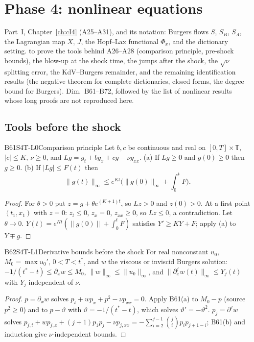 \chapter{Phase 4: nonlinear equations}\label{ch:cII4}
\chapterbrief
{Part~I, Chapter~\ref{ch:cI4} (A25--A31), and its notation: Burgers flows $S$, $S_B$, $S_A$, the Lagrangian map $X$, $J$, the Hopf--Lax functional $\Phi_x$, and the dictionary setting.}
{to prove the tools behind A26--A28 (comparison principle, pre-shock bounds), the blow-up at the shock time, the jumps after the shock, the $\sqrt\nu$ splitting error, the KdV--Burgers remainder, and the remaining identification results (the negative theorem for complete dictionaries, closed forms, the degree bound for Burgers).}
{Dim.~B61--B72, followed by the list of nonlinear results whose long proofs are not reproduced here.}

\section{Tools before the shock}

\begin{dimcard}{B61}{S4T-L0}{Comparison principle}{\proved}{}
Let $b,c$ be continuous and real on $[0,T]\times\mathbb T$, $|c|\le K$, $\nu\ge0$, and $Lg=g_t+bg_x+cg-\nu g_{xx}$. (a) If $Lg\ge0$ and $g(0)\ge0$ then $g\ge0$. (b) If $|Lg|\le F(t)$ then
\[
\|g(t)\|_\infty\le e^{Kt}\Big(\|g(0)\|_\infty+\int_0^tF\Big).
\]
\end{dimcard}
\begin{proof}
For $\theta>0$ put $z=g+\theta e^{(K+1)t}$, so $Lz>0$ and $z(0)>0$. At a first point $(t_1,x_1)$ with $z=0$: $z_t\le0$, $z_x=0$, $z_{xx}\ge0$, so $Lz\le0$, a contradiction. Let $\theta\to0$.
$Y(t)=e^{Kt}(\|g(0)\|+\int_0^tF)$ satisfies $Y'\ge KY+F$; apply (a) to $Y\mp g$.
\end{proof}

\begin{dimcard}{B62}{S4T-L1}{Derivative bounds before the shock}{\proved}{}
For real nonconstant $u_0$, $M_0=\max u_0'$, $0<T<t^*$, and $w$ the viscous or inviscid Burgers solution: $-1/(t^*-t)\le\partial_xw\le M_0$, $\|w\|_\infty\le\|u_0\|_\infty$, and $\|\partial_x^jw(t)\|_\infty\le Y_j(t)$ with $Y_j$ independent of $\nu$.
\end{dimcard}
\begin{proof}
$p=\partial_xw$ solves $p_t+wp_x+p^2-\nu p_{xx}=0$. Apply B61(a) to $M_0-p$ (source $p^2\ge0$) and to $p-\vartheta$ with $\vartheta=-1/(t^*-t)$, which solves $\vartheta'=-\vartheta^2$.
$p_j=\partial^jw$ solves $p_{j,t}+wp_{j,x}+(j+1)p_1p_j-\nu p_{j,xx}=-\sum_{i=2}^{j-1}\binom jip_ip_{j+1-i}$; B61(b) and induction give $\nu$-independent bounds.
\end{proof}

